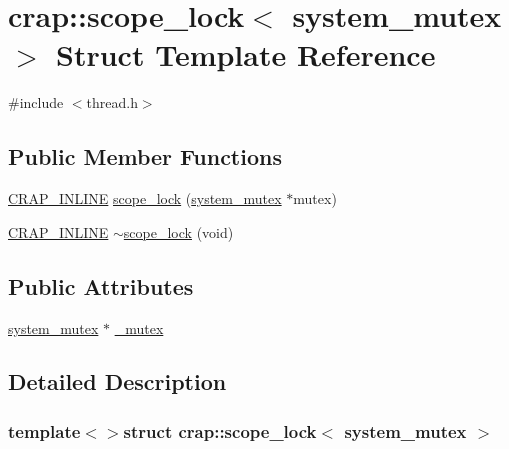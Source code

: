 \hypertarget{structcrap_1_1scope__lock_3_01system__mutex_01_4}{\section{crap\+:\+:scope\+\_\+lock$<$ system\+\_\+mutex $>$ Struct Template Reference}
\label{structcrap_1_1scope__lock_3_01system__mutex_01_4}
}


{\ttfamily \#include $<$thread.\+h$>$}

\subsection*{Public Member Functions}
\begin{DoxyCompactItemize}
\item 
\hyperlink{config__x86_8h_a5a40526b8d842e7ff731509998bb0f1c}{C\+R\+A\+P\+\_\+\+I\+N\+L\+I\+N\+E} \hyperlink{structcrap_1_1scope__lock_3_01system__mutex_01_4_a09c093b6fbc1051656b67efd0f97d3e0}{scope\+\_\+lock} (\hyperlink{classcrap_1_1system__mutex}{system\+\_\+mutex} $\ast$mutex)
\item 
\hyperlink{config__x86_8h_a5a40526b8d842e7ff731509998bb0f1c}{C\+R\+A\+P\+\_\+\+I\+N\+L\+I\+N\+E} \hyperlink{structcrap_1_1scope__lock_3_01system__mutex_01_4_a04129f556b65228da8027a9f06c01f19}{$\sim$scope\+\_\+lock} (void)
\end{DoxyCompactItemize}
\subsection*{Public Attributes}
\begin{DoxyCompactItemize}
\item 
\hyperlink{classcrap_1_1system__mutex}{system\+\_\+mutex} $\ast$ \hyperlink{structcrap_1_1scope__lock_3_01system__mutex_01_4_a3b2b0e888958844a834b7bde108c4b10}{\+\_\+mutex}
\end{DoxyCompactItemize}


\subsection{Detailed Description}
\subsubsection*{template$<$$>$struct crap\+::scope\+\_\+lock$<$ system\+\_\+mutex $>$}



